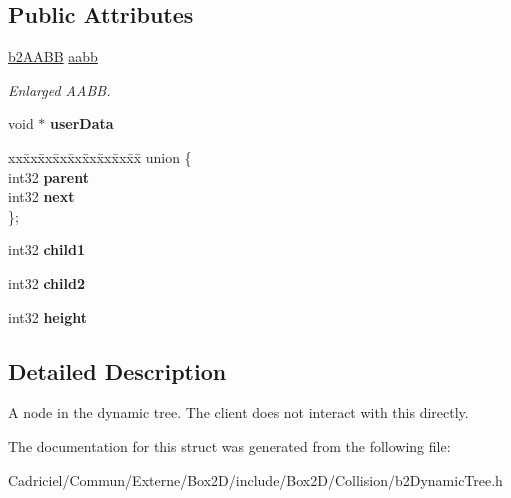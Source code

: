 \subsection*{Public Attributes}
\begin{DoxyCompactItemize}
\item 
\hyperlink{structb2_a_a_b_b}{b2\+A\+A\+BB} \hyperlink{structb2_tree_node_a798f1a594b33c713be45e76e79912239}{aabb}\hypertarget{structb2_tree_node_a798f1a594b33c713be45e76e79912239}{}\label{structb2_tree_node_a798f1a594b33c713be45e76e79912239}

\begin{DoxyCompactList}\small\item\em Enlarged A\+A\+BB. \end{DoxyCompactList}\item 
void $\ast$ {\bfseries user\+Data}\hypertarget{structb2_tree_node_aff77b3eb48326aca1b0762f5c45e56e7}{}\label{structb2_tree_node_aff77b3eb48326aca1b0762f5c45e56e7}

\item 
\begin{tabbing}
xx\=xx\=xx\=xx\=xx\=xx\=xx\=xx\=xx\=\kill
union \{\\
\>int32 {\bfseries parent}\\
\>int32 {\bfseries next}\\
\}; \hypertarget{structb2_tree_node_a9d8975d1e109fb59c7f549f1da7d75c4}{}\label{structb2_tree_node_a9d8975d1e109fb59c7f549f1da7d75c4}
\\

\end{tabbing}\item 
int32 {\bfseries child1}\hypertarget{structb2_tree_node_a3a320f2afc7d223e92ee3629602be5ca}{}\label{structb2_tree_node_a3a320f2afc7d223e92ee3629602be5ca}

\item 
int32 {\bfseries child2}\hypertarget{structb2_tree_node_aa6774ce329715b20d8b7cc8b6e3d50bc}{}\label{structb2_tree_node_aa6774ce329715b20d8b7cc8b6e3d50bc}

\item 
int32 {\bfseries height}\hypertarget{structb2_tree_node_acd183ac94a8d44195c787111be4c22e2}{}\label{structb2_tree_node_acd183ac94a8d44195c787111be4c22e2}

\end{DoxyCompactItemize}


\subsection{Detailed Description}
A node in the dynamic tree. The client does not interact with this directly. 

The documentation for this struct was generated from the following file\+:\begin{DoxyCompactItemize}
\item 
Cadriciel/\+Commun/\+Externe/\+Box2\+D/include/\+Box2\+D/\+Collision/b2\+Dynamic\+Tree.\+h\end{DoxyCompactItemize}
